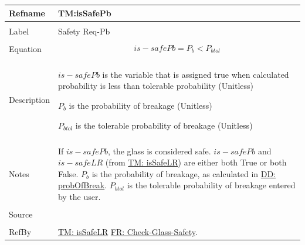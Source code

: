 \documentclass[12pt]{article}
\begin{document}
\noindent \begin{minipage}{\textwidth}
\begin{tabular}{p{} p{}}
\toprule \textbf{Refname} & \textbf{TM:isSafePb}
\label{TM:isSafePb}
\\ \midrule \\
Label & Safety Req-Pb
\\ \midrule \\
Equation & \begin{displaymath}
           is-safePb={P_{b}}<{P_{btol}}
           \end{displaymath}
\\ \midrule \\
Description & \begin{symbDescription}
              \item{$is-safePb$ is the variable that is assigned true when calculated probability is less than tolerable probability (Unitless)}
              \item{${P_{b}}$ is the probability of breakage (Unitless)}
              \item{${P_{btol}}$ is the tolerable probability of breakage (Unitless)}
              \end{symbDescription}
\\ \midrule \\
Notes & If $is-safePb$, the glass is considered safe. $is-safePb$ and $is-safeLR$ (from \hyperref[TM:isSafeLR]{TM: isSafeLR}) are either both True or both False. ${P_{b}}$ is the probability of breakage, as calculated in \hyperref[DD:probOfBreak]{DD: probOfBreak}. ${P_{btol}}$ is the tolerable probability of breakage entered by the user.
\\ \midrule \\
Source & \cite{astm2009}
\\ \midrule \\
RefBy & \hyperref[TM:isSafeLR]{TM: isSafeLR} \hyperref[checkGlassSafety]{FR: Check-Glass-Safety}.
\\ \bottomrule \end{tabular}
\end{minipage}
\par~
\end{document}

